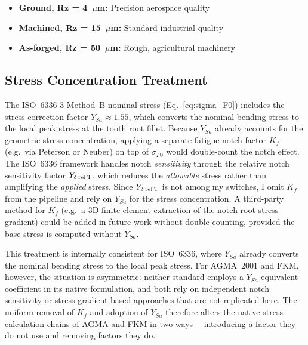 \documentclass[twocolumn,12pt,a4paper]{article}
\begin{document}
\begin{itemize}
  \item \textbf{Ground, Rz = 4~$\mu$m:} Precision aerospace quality
  \item \textbf{Machined, Rz = 15~$\mu$m:} Standard industrial quality
  \item \textbf{As-forged, Rz = 50~$\mu$m:} Rough, agricultural machinery
\end{itemize}

\subsection{Stress Concentration Treatment}
\label{sec:stress_concentration}

The ISO~6336-3 Method~B nominal stress (Eq.~\ref{eq:sigma_F0}) includes
the stress correction factor $Y_{Sa} \approx 1.55$, which converts the
nominal bending stress to the local peak stress at the tooth root
fillet. Because $Y_{Sa}$ already accounts for the geometric stress
concentration, applying a separate fatigue notch factor $K_f$ (e.g.\
via Peterson or Neuber) on top of $\sigma_{F0}$ would double-count the
notch effect. The ISO~6336 framework handles notch \emph{sensitivity}
through the relative notch sensitivity factor $Y_{\delta\,\rm rel\,T}$,
which reduces the \emph{allowable} stress rather than amplifying the
\emph{applied} stress. Since $Y_{\delta\,\rm rel\,T}$ is not among my
switches, I omit $K_f$ from the pipeline and rely on $Y_{Sa}$ for the
stress concentration. A third-party method for $K_f$ (e.g.\ a 3D
finite-element extraction of the notch-root stress gradient) could be
added in future work without double-counting, provided the base stress
is computed without $Y_{Sa}$.

This treatment is internally consistent for ISO~6336, where $Y_{Sa}$
already converts the nominal bending stress to the local peak stress.
For AGMA~2001 and FKM, however, the situation is asymmetric: neither
standard employs a $Y_{Sa}$-equivalent coefficient in its native
formulation, and both rely on independent notch sensitivity or
stress-gradient-based approaches that are not replicated here. The
uniform removal of $K_f$ and adoption of $Y_{Sa}$ therefore alters the
native stress calculation chains of AGMA and FKM in two ways---%
introducing a factor they do not use and removing factors they do.
\end{document}
